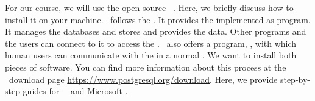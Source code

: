 %
%
%
For our course, we will use the open source  \postgresql~\cite{TA2024DDAMWPAM,FP2023LP,OH2017PUAR,B2024PELUYDW}.
Here, we briefly discuss how to install it on your machine.
\postgresql\ follows the .
It provides the  implemented as  program.
It manages the databases and stores and provides the data.
Other programs and the users can connect to it to access the .
\postgresql\ also offers a  program, \psql, with which human users can communicate with the   in a normal .
We want to install both pieces of software.
You can find more information about this process at the \postgresql\ download page \url{https://www.postgresql.org/download}.
Here, we provide step-by-step guides for \ubuntu\ \linux\ and Microsoft \windows.%
%
%
%
%
\endhsection%
%
